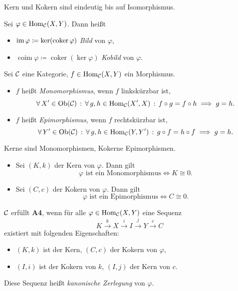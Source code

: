 \documentclass{cheat-sheet}
\DeclareMathOperator{\coker}{coker} %
\DeclareMathOperator{\coim}{coim} %
\begin{document}
\begin{bem}
  Kern und Kokern sind eindeutig bis auf Isomorphismus.
\end{bem}

\begin{defn}
  Sei $\varphi \in \operatorname{Hom}_{\mathcal{C}}(X, Y)$. Dann heißt
  \begin{itemize}
    \item $\im \varphi \coloneqq \ker(\coker \varphi)$ \emph{Bild} von $\varphi$,
    \item $\coim \varphi \coloneqq \coker(\ker \varphi)$ \emph{Kobild} von $\varphi$.
  \end{itemize}
\end{defn}

\begin{defn}
  Sei $\mathcal{C}$ eine Kategorie, $f \in \operatorname{Hom}_{\mathcal{C}}(X, Y)$ ein Morphismus.
  \begin{itemize}
    \item $f$ heißt \emph{Monomorphismus}, wenn $f$ linkskürzbar ist, \dh{}
    \[
      \forall \, {X' \in \operatorname{Ob}(\mathcal{C})} \,:\, \forall \, {g, h \in \operatorname{Hom}_{\mathcal{C}}(X', X)} \,:\,
      f \circ g = f \circ h \implies g = h.
    \]
    \item $f$ heißt \emph{Epimorphismus}, wenn $f$ rechtskürzbar ist, \dh{}
    \[
      \forall \, {Y' \in \operatorname{Ob}(\mathcal{C})} \,:\, \forall \, {g, h \in \operatorname{Hom}_{\mathcal{C}}(Y, Y')} \,:\,
      g \circ f = h \circ f \implies g = h.
    \]
  \end{itemize}
\end{defn}

\begin{lem}
  Kerne sind Monomorphismen, Kokerne Epimorphismen.
\end{lem}

\begin{lem}
  \begin{itemize}
    \item Sei $(K, k)$ der Kern von $\varphi$. Dann gilt
    \[ \varphi \text{ ist ein Monomorphismus} \iff K \cong 0. \]
    \item Sei $(C, c)$ der Kokern von $\varphi$. Dann gilt
    \[ \varphi \text{ ist ein Epimorphismus} \iff C \cong 0. \]
  \end{itemize}
\end{lem}

\begin{axiom}
  $\mathcal{C}$ erfüllt \textbf{A4}, wenn für alle $\varphi \in \operatorname{Hom}_{\mathcal{C}}(X, Y)$ eine Sequenz
  \[ K \xrightarrow{k} X \xrightarrow{i} I \xrightarrow{j} Y \xrightarrow{c} C \]
  existiert mit folgenden Eigenschaften: 
  \begin{itemize}
    \item $(K, k)$ ist der Kern, $(C, c)$ der Kokern von $\varphi$,
    \item $(I, i)$ ist der Kokern von $k$, $(I, j)$ der Kern von $c$.
  \end{itemize}
  Diese Sequenz heißt \emph{kanonische Zerlegung} von $\varphi$.
\end{axiom}
\end{document}

